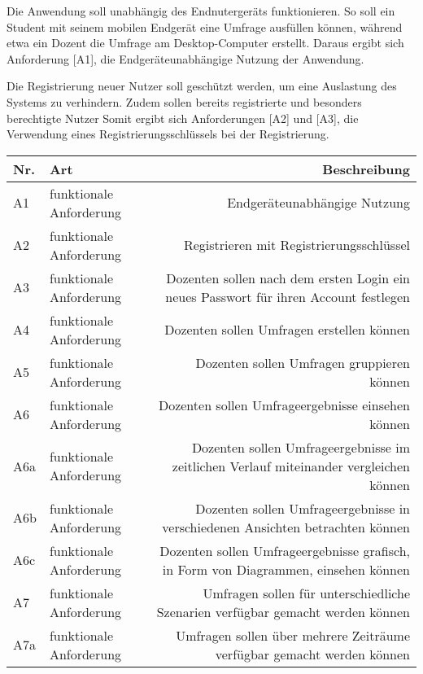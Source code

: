 Die Anwendung soll unabhängig des Endnutergeräts funktionieren.
So soll ein Student mit seinem mobilen Endgerät eine Umfrage ausfüllen können, während etwa ein Dozent die Umfrage am Desktop-Computer erstellt.
Daraus ergibt sich Anforderung [A1], die Endgeräteunabhängige Nutzung der Anwendung.

Die Registrierung neuer Nutzer soll geschützt werden, um eine Auslastung des Systems zu verhindern.
Zudem sollen bereits registrierte und besonders berechtigte Nutzer
Somit ergibt sich Anforderungen [A2] und [A3], die Verwendung eines Registrierungsschlüssels bei der Registrierung.

    \begin{tabularx}{\textwidth}{|l|k|r|}
      \hline
      {Nr.} & {Art} & {Beschreibung} \\
      \hline
      {\label{Anf:A1}A1} & funktionale Anforderung & Endgeräteunabhängige Nutzung\\
      \hline
      {\label{Anf:A2}A2} & funktionale Anforderung & Registrieren mit Registrierungsschlüssel \\
      \hline
      {\label{Anf:A3}A3} & funktionale Anforderung & Dozenten sollen nach dem ersten Login ein neues Passwort für ihren Account festlegen \\
      \hline
      {\label{Anf:A4}A4} & funktionale Anforderung & Dozenten sollen Umfragen erstellen können\\
      \hline
      {\label{Anf:A5}A5} & funktionale Anforderung & Dozenten sollen Umfragen gruppieren können\\
      \hline
      {\label{Anf:A6}A6} & funktionale Anforderung & Dozenten sollen Umfrageergebnisse einsehen können\\
      \hline
      {\label{Anf:A6a}A6a} & funktionale Anforderung & Dozenten sollen Umfrageergebnisse im zeitlichen Verlauf miteinander vergleichen können\\
      \hline
      {\label{Anf:A6b}A6b} & funktionale Anforderung & Dozenten sollen Umfrageergebnisse in verschiedenen Ansichten betrachten können\\
      \hline
      {\label{Anf:A6c}A6c} & funktionale Anforderung & Dozenten sollen Umfrageergebnisse grafisch, in Form von Diagrammen, einsehen können\\
      \hline
      {\label{Anf:A7}A7} & funktionale Anforderung & Umfragen sollen für unterschiedliche Szenarien verfügbar gemacht werden können \\
      \hline
      {\label{Anf:A7a}A7a} & funktionale Anforderung & Umfragen sollen über mehrere Zeiträume verfügbar gemacht werden können \\

\end{tabularx}
